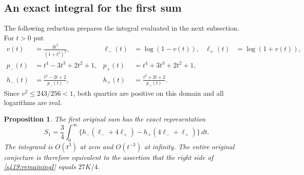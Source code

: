 \documentclass[11pt,a4paper]{article}
\newtheorem{proposition}[theorem]{Proposition}
\theoremstyle{remark}\newtheorem{remark}[theorem]{Remark}
\numberwithin{equation}{section}
\begin{document}
\subsection{An exact integral for the first sum}
The following reduction prepares the integral evaluated in the next subsection.
For $t>0$ put
\begin{align*}
 v(t)&=\frac{3t^3}{(1+t^2)^2},&
 \ell_-(t)&=\log(1-v(t)),&\ell_+(t)&=\log(1+v(t)),\\
 p_-(t)&=t^4-3t^3+2t^2+1,&
 p_+(t)&=t^4+3t^3+2t^2+1,\\
 h_-(t)&=\frac{t^2-2t+2}{p_-(t)},&
 h_+(t)&=\frac{t^2+2t+2}{p_+(t)}.
\end{align*}
Since $v^2\le243/256<1$, both quartics are positive on this domain and all
logarithms are real.
\begin{proposition}\label{s419:remaining}
The first original sum has the exact representation
\begin{equation}\label{s419:remainingI}
 S_1=\frac34\int_0^\infty
 \{h_-(\ell_-+4\ell_+)-h_+(4\ell_-+\ell_+)\}\,dt.
\end{equation}
The integrand is $O(t^3)$ at zero and $O(t^{-3})$ at infinity.
The entire original conjecture is therefore equivalent to the assertion
that the right side of \eqref{s419:remainingI} equals $27K/4$.
\end{proposition}
\end{document}
